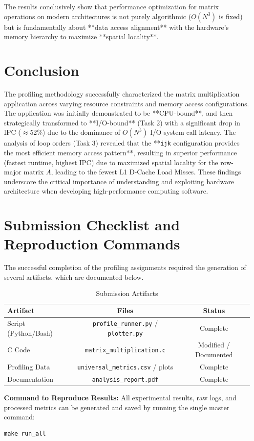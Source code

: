 \documentclass[11pt, a4paper]{article}
\begin{document}
The results conclusively show that performance optimization for matrix operations on modern architectures is not purely algorithmic ($O(N^3)$ is fixed) but is fundamentally about **data access alignment** with the hardware's memory hierarchy to maximize **spatial locality**.

\section{Conclusion}
The profiling methodology successfully characterized the matrix multiplication application across varying resource constraints and memory access configurations. The application was initially demonstrated to be **CPU-bound**, and then strategically transformed to **I/O-bound** (Task 2) with a significant drop in IPC ($\approx 52\%$) due to the dominance of $O(N^3)$ I/O system call latency. The analysis of loop orders (Task 3) revealed that the **\texttt{ijk} configuration provides the most efficient memory access pattern**, resulting in superior performance (fastest runtime, highest IPC) due to maximized spatial locality for the row-major matrix $A$, leading to the fewest L1 D-Cache Load Misses. These findings underscore the critical importance of understanding and exploiting hardware architecture when developing high-performance computing software.

\section{Submission Checklist and Reproduction Commands}

The successful completion of the profiling assignments required the generation of several artifacts, which are documented below.

\begin{table}[h]
\centering
\caption{Submission Artifacts}
\label{tab:submission_artifacts}
\begin{tabularx}{\textwidth}{l C C}
\toprule
\textbf{Artifact} & \textbf{Files} & \textbf{Status} \\
\midrule
Script (Python/Bash) & \texttt{profile\_runner.py} / \texttt{plotter.py} & Complete \\
C Code & \texttt{matrix\_multiplication.c} & Modified / Documented \\
Profiling Data & \texttt{universal\_metrics.csv} / plots & Complete \\
Documentation & \texttt{analysis\_report.pdf} & Complete \\
\bottomrule
\end{tabularx}
\end{table}

\noindent\textbf{Command to Reproduce Results:} All experimental results, raw logs, and processed metrics can be generated and saved by running the single master command:

\begin{verbatim}
make run_all
\end{verbatim}
\end{document}
